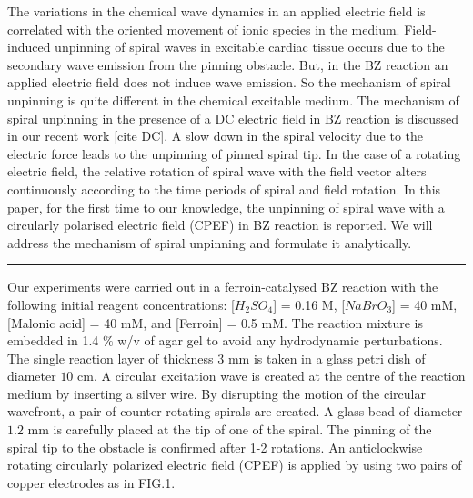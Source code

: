 \documentclass[%
 preprint,
 amsmath,amssymb,
 aps,
]{revtex4-2}
\begin{document}
The variations in the chemical wave dynamics in an applied electric field is correlated with the oriented movement of ionic species in the medium.
Field-induced unpinning of spiral waves in excitable cardiac tissue occurs due to the secondary wave emission from the pinning obstacle. But, in the BZ reaction an applied electric field does not induce wave emission. So the mechanism of spiral unpinning is quite different in the chemical excitable medium. The mechanism of spiral unpinning in the presence of a DC electric field in BZ reaction is discussed in our recent work [cite DC]. A slow down in the spiral velocity due to the electric force leads to the unpinning of pinned spiral tip. 
In the case of a rotating electric field, the relative rotation of spiral wave with the field vector alters continuously according to the time periods of spiral and field rotation. In this paper, for the first time to our knowledge, the unpinning of spiral wave with a circularly polarised electric field (CPEF) in BZ reaction is reported. We will address the mechanism of spiral unpinning and formulate it analytically.
 
\vspace{5pt}
\hrule
\vspace{5pt}



Our experiments were carried out in a ferroin-catalysed BZ reaction with the following initial reagent concentrations: [$H_2SO_4$] = 0.16 M, [$NaBrO_3$] = 40 mM, [Malonic acid] = 40 mM, and
[Ferroin] = 0.5 mM. The reaction mixture is embedded in 1.4 $\%$ w/v of agar gel to avoid any hydrodynamic perturbations. The single reaction layer of thickness $3$ mm is taken in a glass petri dish of diameter $10$ cm. 
A circular excitation wave is created at the centre of the reaction medium by inserting a silver wire. By disrupting the motion of the circular wavefront, a pair of counter-rotating spirals are created. A glass bead of diameter $1.2$ mm is carefully placed at the tip of one of the spiral. The pinning of the spiral tip to the obstacle is confirmed after 1-2 rotations.
An anticlockwise rotating circularly polarized electric field (CPEF) is applied by using two pairs of copper electrodes as in FIG.1. 
\end{document}
